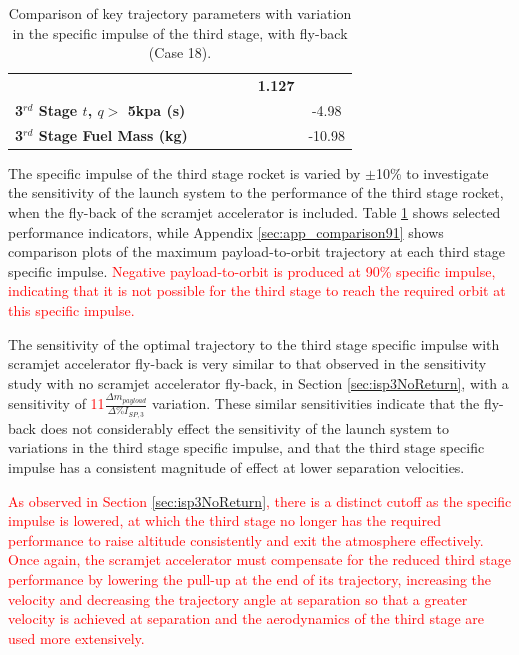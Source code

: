 \begin{table}[ht]
\begin{tabular}{l c c c c c c}
		& \textbf{\thirddExergyEffISPThreeNinetyFive}
		& \textbf{\thirddExergyEffISPThreeStandard}
		& \textbf{\thirddExergyEffISPThreeOneHundredFive}
		& \textbf{\thirddExergyEffISPThreeOneHundredTen}
		& \textbf{1.127}
		\\
		\textbf{3$^{rd}$ Stage $t$, $q >$ 5kpa (s)}
		& \thirdqOverFiveISPThreeNinety
		& \thirdqOverFiveISPThreeNinetyFive
		& \thirdqOverFiveISPThreeStandard
		& \thirdqOverFiveISPThreeOneHundredFive
		& \thirdqOverFiveISPThreeOneHundredTen
		&-4.98
		\\
		\textbf{3$^{rd}$ Stage Fuel Mass (kg)}
		& \thirdmFuelISPThreeNinety
		& \thirdmFuelISPThreeNinetyFive
		& \thirdmFuelISPThreeStandard
		& \thirdmFuelISPThreeOneHundredFive
		& \thirdmFuelISPThreeOneHundredTen
		&-10.98
		\\
		\hline 
	\end{tabular} 
	\caption{Comparison of key trajectory parameters with variation in the specific impulse of the third stage, with fly-back (Case 18).}
	\label{tab:isp3}
\end{table}

The specific impulse of the third stage rocket is varied by $\pm$10\% to investigate the sensitivity of the launch system to the performance of the third stage rocket, when the fly-back of the scramjet accelerator is included. 
Table \ref{tab:isp3} shows selected performance indicators, while Appendix \ref{sec:app_comparison91} shows comparison plots of the maximum payload-to-orbit trajectory at each third stage specific impulse. \textcolor{red}{Negative payload-to-orbit is produced at 90\% specific impulse, indicating that it is not possible for the third stage to reach the required orbit at this specific impulse. }

The sensitivity of the optimal trajectory to the third stage specific impulse with scramjet accelerator fly-back is very similar to that observed in the sensitivity study with no scramjet accelerator fly-back, in Section \ref{sec:isp3NoReturn}, with a sensitivity of \textcolor{red}{11}$\frac{\Delta m_{payload}}{\Delta\%I_{SP,3}}$ variation. 
These similar sensitivities indicate that the fly-back does not considerably effect the sensitivity of the launch system to variations in the third stage specific impulse, and that the third stage specific impulse has a consistent magnitude of effect at lower separation velocities. 

\textcolor{red}{As observed in Section \ref{sec:isp3NoReturn}, there is a distinct cutoff as the specific impulse is lowered, at which the third stage no longer has the required performance to raise altitude consistently and exit the atmosphere effectively. Once again, the scramjet accelerator must compensate for the reduced third stage performance by lowering the pull-up at the end of its trajectory, increasing the velocity and decreasing the trajectory angle at separation so that a greater velocity is achieved at separation and the aerodynamics of the third stage are used more extensively.} 






